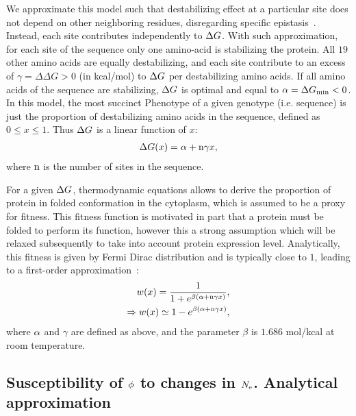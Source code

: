 We approximate this model such that destabilizing effect at a particular site does not depend on other neighboring residues, disregarding specific epistasis~\citep{Dasmeh2014}.
Instead, each site contributes independently to $\Delta G$.
With such approximation, for each site of the sequence only one amino-acid is stabilizing the protein.
All $19$ other amino acids are equally destabilizing, and each site contribute to an excess of $\gamma = \Delta \Delta G > 0$ (in kcal/mol) to $\Delta G$ per destabilizing amino acids.
If all amino acids of the sequence are stabilizing, $\Delta G$ is optimal and equal to $ \alpha = \Delta G_{\text{min}} < 0$.
In this model, the most succinct \gls{Phenotype} of a given genotype (i.e. sequence) is just the proportion of destabilizing amino acids in the sequence, defined as $0 \leq x \leq 1$.
Thus $\Delta G$ is a linear function of $x$:
\begin{align}
    \Delta G (x) = \alpha + \text{n} \gamma x,
\end{align}
where $\text{n}$ is the number of sites in the sequence.

For a given $\Delta G$, thermodynamic equations allows to derive the proportion of protein in folded conformation in the cytoplasm, which is assumed to be a proxy for fitness.
This fitness function is motivated in part that a protein must be folded to perform its function, however this a strong assumption which will be relaxed subsequently to take into account protein expression level.
Analytically, this fitness is given by Fermi Dirac distribution and is typically close to $1$, leading to a first-order approximation~\citep{Goldstein2011}:
\begin{align}
    w (x) = \dfrac{1}{1 + e^{\beta (\alpha + \text{n} \gamma x)}},\\
    \Rightarrow w (x) \simeq 1 - e^{\beta (\alpha + \text{n} \gamma x)},
\end{align}
where $\alpha$ and $\gamma$ are defined as above, and the parameter $\beta$ is $1.686$ mol/kcal at room temperature.

\subsection{Susceptibility of \texorpdfstring{$\phi$}{φ} to changes in \texorpdfstring{$N_{\mathrm{e}}$}{Nₑ}. Analytical approximation}

